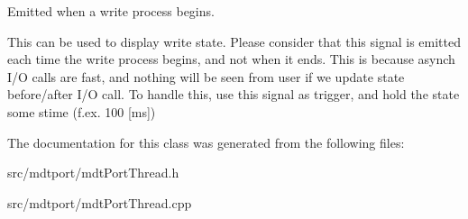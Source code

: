 Emitted when a write process begins. 

This can be used to display write state. Please consider that this signal is emitted each time the write process begins, and not when it ends. This is because asynch I/O calls are fast, and nothing will be seen from user if we update state before/after I/O call. To handle this, use this signal as trigger, and hold the state some stime (f.ex. 100 \mbox{[}ms\mbox{]}) 

The documentation for this class was generated from the following files:\begin{DoxyCompactItemize}
\item 
src/mdtport/mdtPortThread.h\item 
src/mdtport/mdtPortThread.cpp\end{DoxyCompactItemize}
